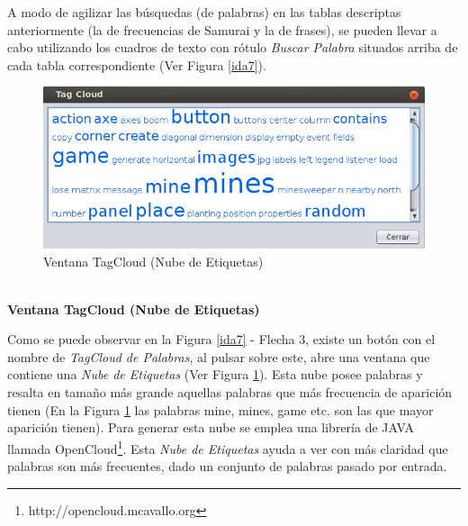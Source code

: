 A modo de agilizar las búsquedas (de palabras) en las tablas descriptas anteriormente (la de frecuencias de Samurai y la de frases), se pueden llevar a cabo utilizando los cuadros de texto con rótulo \textit{Buscar Palabra} situados arriba de cada tabla correspondiente (Ver Figura \ref{ida7}).

\begin{figure}[t] %
\centerline{%
\includegraphics[scale= 0.75]{./cap4/ida_08.png}
}
\caption{Ventana TagCloud (Nube de Etiquetas)}
\label{ida8}
\end{figure}

\noindent \textbf{\\Ventana TagCloud (Nube de Etiquetas)\\} 

Como se puede observar en la Figura \ref{ida7} - Flecha 3, existe un botón con el nombre de \textit{TagCloud de Palabras}, al pulsar sobre este, abre una ventana que contiene una \textit{Nube de Etiquetas} (Ver Figura \ref{ida8}). Esta nube posee palabras y resalta en tamaño más grande aquellas palabras que más frecuencia de aparición tienen (En la Figura \ref{ida8} las palabras \textsf{mine}, \textsf{mines}, \textsf{game} etc. son las que mayor aparición tienen). Para generar esta nube se emplea una librería de JAVA llamada OpenCloud\footnote[1]{http://opencloud.mcavallo.org}.
Esta \textit{Nube de Etiquetas} ayuda a ver con más claridad que palabras son más frecuentes, dado un conjunto de palabras pasado por entrada. 

